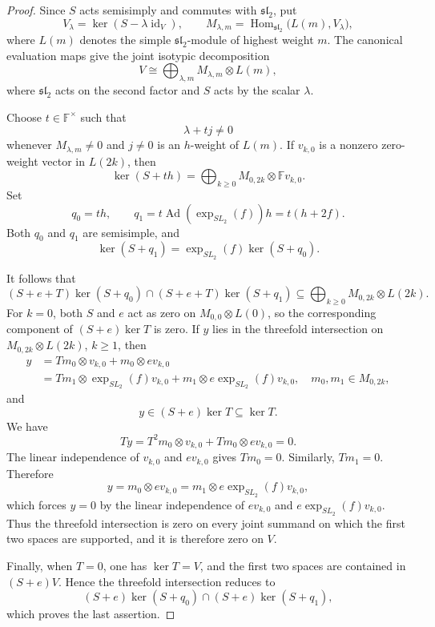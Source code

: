 \documentclass[12pt,reqno]{amsart}
\theoremstyle{definition}
\theoremstyle{remark}
\numberwithin{equation}{section}
\newcommand{\F}{\mathbb{F}}
\newcommand{\Ad}{\operatorname{Ad}}
\newcommand{\id}{\operatorname{id}}
\begin{document}
\begin{proof}
Since \(S\) acts semisimply and commutes with \(\mathfrak{sl}_2\), put
\[
  V_\lambda=\ker(S-\lambda\id_V),
  \qquad
  M_{\lambda,m}=\operatorname{Hom}_{\mathfrak{sl}_2}\bigl(L(m),V_\lambda\bigr),
\]
where \(L(m)\) denotes the simple \(\mathfrak{sl}_2\)-module of highest
weight \(m\).  The canonical evaluation maps give the joint isotypic
decomposition
\[
  V\cong
  \bigoplus_{\lambda,m}M_{\lambda,m}\otimes L(m),
\]
where \(\mathfrak{sl}_2\) acts on the second factor and \(S\) acts by the scalar
\(\lambda\).

Choose \(t\in\F^\times\) such that
\[
  \lambda+tj\ne0
\]
whenever \(M_{\lambda,m}\ne0\) and \(j\ne0\) is an \(h\)-weight of
\(L(m)\).  If \(v_{k,0}\) is a nonzero zero-weight vector in \(L(2k)\),
then
\[
  \ker(S+th)=\bigoplus_{k\ge0} M_{0,2k}\otimes\F v_{k,0}.
\]
Set
\[
  q_0=th,\qquad
  q_1=t\Ad(\exp_{SL_2}(f))h= t(h+2f).
\]
Both \(q_0\) and \(q_1\) are semisimple, and
\[
  \ker(S+q_1)=\exp_{SL_2}(f)\ker(S+q_0).
\]

It follows that
\[
(S+e+T)\ker(S+q_0)\cap (S+e+T)\ker(S+q_1)\subseteq \bigoplus_{k\ge0} M_{0,2k}\otimes L(2k).
\]
For $k=0$, both $S$ and $e$ act as zero on
$M_{0,0}\otimes L(0)$, so the corresponding component of
$(S+e)\ker T$ is zero. If $y$ lies in the threefold intersection on
$M_{0,2k}\otimes L(2k)$, $k\ge 1$, then
\[
\begin{aligned}
 y&=Tm_0\otimes v_{k,0}+m_0\otimes ev_{k,0}\\
  &=Tm_1\otimes \exp_{SL_2}(f)v_{k,0}+m_1\otimes e\exp_{SL_2}(f)v_{k,0}, \quad m_0,m_1\in M_{0,2k},
\end{aligned}
\]
and
\[
 y\in (S+e)\ker T\subseteq\ker T.
\]
We have
\[
Ty= T^2m_0\otimes v_{k,0}+ Tm_0\otimes ev_{k,0}= 0.
\]
The linear independence of $v_{k,0}$ and $ev_{k,0}$ gives \(Tm_0=0\).
Similarly, \(Tm_1=0\). Therefore
\[
 y=m_0\otimes ev_{k,0}
  =m_1\otimes e\exp_{SL_2}(f)v_{k,0},
\]
which forces $y=0$ by the linear independence of $ev_{k,0}$ and $e\exp_{SL_2}(f)v_{k,0}$.
Thus the threefold intersection is zero on every joint summand on
which the first two spaces are supported, and it is therefore zero on $V$.

Finally, when $T=0$, one has $\ker T=V$, and the first two spaces
are contained in $(S+e)V$. Hence the threefold intersection reduces
to
\[
 (S+e)\ker(S+q_0)\cap(S+e)\ker(S+q_1),
\]
which proves the last assertion.
\end{proof}
\end{document}
